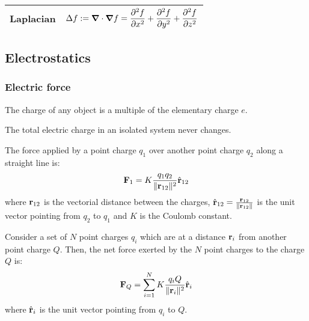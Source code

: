 \documentclass[../../../main.tex]{subfiles}
\begin{document}
\begin{center}
\begin{tabular}{|c|c|}
    \hline
    Laplacian  & $\displaystyle\Delta f:=\grad\cdot\grad f=\frac{\partial^2f}{\partial x^2}+\frac{\partial^2f}{\partial y^2}+\frac{\partial^2f}{\partial z^2}$                                                                                                                                                                              \\
    \hline
  \end{tabular}
\end{center}
\begin{multicols}{2}
  \subsection{Electrostatics}
  \subsubsection{Electric force}
  \begin{proposition}
    The charge of any object is a multiple of the elementary charge $e$.
  \end{proposition}
  \begin{law}
    The total electric charge in an isolated system never changes.
  \end{law}
  \begin{law}
    The force applied by a point charge $q_1$ over another point charge $q_2$ along a straight line is:
    $$\boldsymbol{\mathrm{F}}_1=K\frac{q_1q_2}{\|\boldsymbol{\mathrm{r}}_{12}\|^2}\hat{\boldsymbol{\mathrm{r}}}_{12}$$
    where $\boldsymbol{\mathrm{r}}_{12}$ is the vectorial distance between the charges, $\hat{\boldsymbol{\mathrm{r}}}_{12}=\frac{\boldsymbol{\mathrm{r}}_{12}}{\|\boldsymbol{\mathrm{r}}_{12}\|}$ is the unit vector pointing from $q_2$ to $q_1$ and $K$ is the Coulomb constant.
  \end{law}
  \begin{principle}
    Consider a set of $N$ point charges $q_i$ which are at a distance $\boldsymbol{\mathrm{r}}_i$ from another point charge $Q$. Then, the net force exerted by the $N$ point charges to the charge $Q$ is:
    $$\boldsymbol{\mathrm{F}}_Q=\sum_{i=1}^NK\frac{q_iQ}{\|\boldsymbol{\mathrm{r}}_{i}\|^2}\hat{\boldsymbol{\mathrm{r}}}_{i}$$ where $\hat{\boldsymbol{\mathrm{r}}}_{i}$ is the unit vector pointing from $q_i$ to $Q$.
  \end{principle}

\end{multicols}
\end{document}

